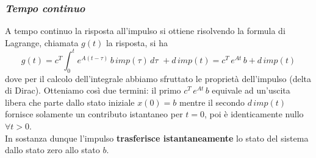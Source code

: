 \documentclass[a4paper]{article}
\begin{document}
	\subsubsection*{\textit{Tempo continuo}}
	A tempo continuo la risposta all'impulso si ottiene risolvendo la formula di Lagrange, chiamata $g(t)$ la risposta, si ha
	\[g(t)=c^T\int_{0}^{t}e^{A(t-\tau)}\,b\,imp(\tau)\,d\tau \,\, +d\,imp(t)=c^T\,e^{At}\,b+d\,imp(t)\] dove per il calcolo dell'integrale abbiamo sfruttato le proprietà dell'impulso (delta di Dirac). Otteniamo così due termini: il primo $c^T\,e^{At}\,b$ equivale ad un'uscita libera che parte dallo stato iniziale $x(0)=b$ mentre il secondo $d\,imp(t)$ fornisce solamente un contributo istantaneo per $t=0$, poi è identicamente nullo $\forall t>0$.\newline\\ In sostanza dunque l'impulso \textbf{trasferisce istantaneamente} lo stato del sistema dallo stato zero allo stato $b$.
\end{document}
